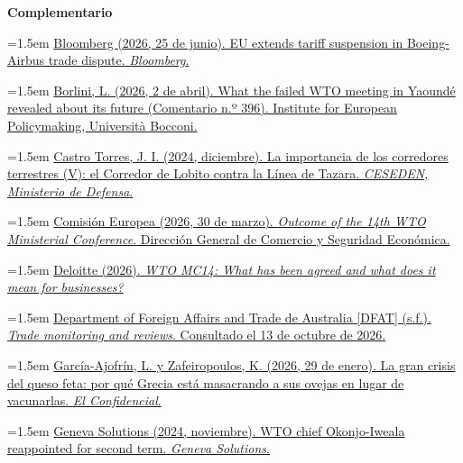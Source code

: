 \documentclass[10pt,a4paper]{article}
\begin{document}
\textbf{Complementario}

\noindent\hangindent=1.5em \href{https://www.bloomberg.com/news/articles/2026-06-25/eu-extends-tariff-suspension-in-boeing-airbus-trade-dispute}{Bloomberg (2026, 25 de junio). EU extends tariff suspension in Boeing-Airbus trade dispute. \textit{Bloomberg}.}

\noindent\hangindent=1.5em \href{https://iep.unibocconi.eu/what-failed-wto-meeting-yaounde-revealed-about-its-future}{Borlini, L. (2026, 2 de abril). What the failed WTO meeting in Yaoundé revealed about its future (Comentario n.º 396). Institute for European Policymaking, Università Bocconi.}

\noindent\hangindent=1.5em \href{https://www.defensa.gob.es/ceseden/-/la_importancia_de_los_corredores_terrestres_el_corredor_de_lobito_contra_la_linea_de_tazara}{Castro Torres, J. I. (2024, diciembre). La importancia de los corredores terrestres (V): el Corredor de Lobito contra la Línea de Tazara. \textit{CESEDEN, Ministerio de Defensa}.}

\noindent\hangindent=1.5em \href{https://policy.trade.ec.europa.eu/news/outcome-14th-wto-ministerial-conference-2026-03-30_en}{Comisión Europea (2026, 30 de marzo). \textit{Outcome of the 14th WTO Ministerial Conference}. Dirección General de Comercio y Seguridad Económica.}

\noindent\hangindent=1.5em \href{https://taxscape.deloitte.com/article/wto-mc14--what-has-been-agreed-and-what-does-it-mean-for-businesses-.aspx}{Deloitte (2026). \textit{WTO MC14: What has been agreed and what does it mean for businesses?}}

\noindent\hangindent=1.5em \href{https://www.dfat.gov.au/trade/organisations/wto/trade-monitoring-and-reviews}{Department of Foreign Affairs and Trade de Australia [DFAT] (s.f.). \textit{Trade monitoring and reviews}. Consultado el 13 de octubre de 2026.}

\noindent\hangindent=1.5em \href{https://www.elconfidencial.com/mundo/2026-01-29/viruela-ovina-grecia-queso-feta-1hms_4291864/}{García-Ajofrín, L. y Zafeiropoulos, K. (2026, 29 de enero). La gran crisis del queso feta: por qué Grecia está masacrando a sus ovejas en lugar de vacunarlas. \textit{El Confidencial}.}

\noindent\hangindent=1.5em \href{https://genevasolutions.news/global-news/wto-chief-okonjo-iweala-reappointed-for-second-term}{Geneva Solutions (2024, noviembre). WTO chief Okonjo-Iweala reappointed for second term. \textit{Geneva Solutions}.}
\end{document}
